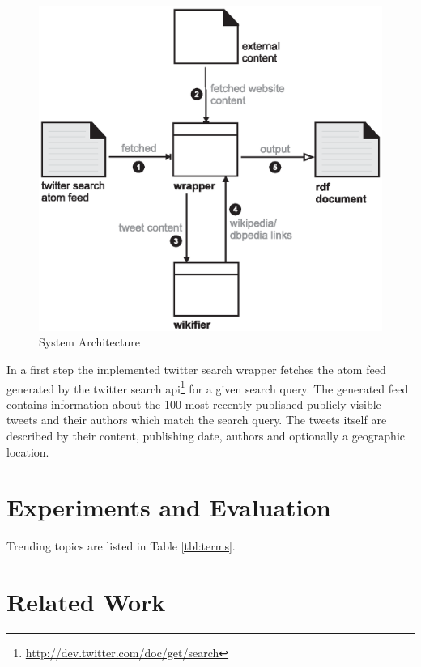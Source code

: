 \documentclass{llncs}
\begin{document}
\begin{figure}[htb]
  \centering
  \includegraphics[width=.6\linewidth]{architecture}
  \caption{System Architecture}
  \label{fig:arch}
\end{figure}

In a first step the implemented twitter search wrapper fetches the atom feed
generated by the twitter search
api\footnote{\url{http://dev.twitter.com/doc/get/search}} for a given search
query. The generated feed contains information about the 100 most recently published publicly visible tweets and
their authors which match the search query. The tweets itself are described by
their content, publishing date, authors and optionally a geographic location.

\section{Experiments and Evaluation}

Trending topics are listed in Table \ref{tbl:terms}.


\begin{definition}[Stability]

\end{definition}

\section{Related Work}
\end{document}
